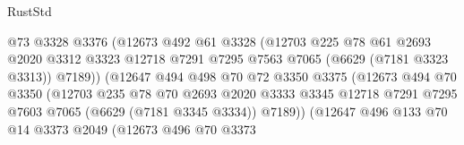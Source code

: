 \begin{lexlean}{RustStd}
\begin{coremodule}
                                  @73
                                  @3328
                                  @3376
                                  (@12673
                                    @492
                                    @61
                                    @3328
                                    (@12703
                                      @225
                                      @78
                                      @61
                                      @2693
                                      @2020
                                      @3312
                                      @3323
                                      @12718
                                      @7291
                                      @7295
                                      @7563
                                      @7065
                                      (@6629 (@7181 @3323 @3313))
                                      @7189))
                                  (@12647
                                    @494
                                    @498
                                    @70
                                    @72
                                    @3350
                                    @3375
                                    (@12673
                                      @494
                                      @70
                                      @3350
                                      (@12703
                                        @235
                                        @78
                                        @70
                                        @2693
                                        @2020
                                        @3333
                                        @3345
                                        @12718
                                        @7291
                                        @7295
                                        @7603
                                        @7065
                                        (@6629 (@7181 @3345 @3334))
                                        @7189))
                                    (@12647
                                      @496
                                      @133
                                      @70
                                      @14
                                      @3373
                                      @2049
                                      (@12673
                                        @496
                                        @70
                                        @3373

\end{coremodule}
\end{lexlean}
